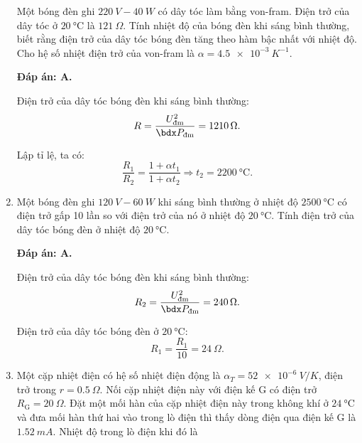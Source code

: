 \begin{enumerate}[label=\bfseries Câu \arabic*:]
	\cauhoi
	{Một bóng đèn ghi $\SI{220}{V} - \SI{40}{W}$ có dây tóc làm bằng von-fram. Điện trở của dây tóc ở $\SI{20}{\celsius}$ là $\SI{121}{\Omega}$. Tính nhiệt độ của bóng đèn khi sáng bình thường, biết rằng điện trở của dây tóc bóng đèn tăng theo hàm bậc nhất với nhiệt độ. Cho hệ số nhiệt điện trở của von-fram là $\alpha = \SI{4.5e-3}{K^{-1}}$.
		
	}
	\loigiai
	{	\textbf{Đáp án: A.}
		
		Điện trở của dây tóc bóng đèn khi sáng bình thường:
		$$R=\dfrac{U_\text{đm}^2}{\calP_\text{đm}} = \SI{1210}{\Omega}.$$
		
		Lập tỉ lệ, ta có:
		$$\dfrac{R_1}{R_2} = \dfrac{1+ \alpha t_1}{1 + \alpha t_2} \Rightarrow t_2 = \SI{2200}{\celsius}.$$
	}
	\item {}
	
	\cauhoi
	{Một bóng đèn ghi $\SI{120}{V} - \SI{60}{W}$ khi sáng bình thường ở nhiệt độ $\SI{2500}{\celsius}$ có điện trở gấp 10 lần so với điện trở của nó ở nhiệt độ $\SI{20}{\celsius}$. Tính điện trở của dây tóc bóng đèn ở nhiệt độ $\SI{20}{\celsius}$.
		
	}
	\loigiai
	{	\textbf{Đáp án: A.}
		
		Điện trở của dây tóc bóng đèn khi sáng bình thường:
		$$R_2 = \dfrac{U_\text{đm}^2}{\calP_\text{đm}} = \SI{240}{\Omega}.$$
		
		Điện trở của dây tóc bóng đèn ở $\SI{20}{\celsius}$:
		$$R_1 = \dfrac{R_1}{10}= \SI{24}{\Omega}.$$
	}
	\item {}

\cauhoi
{Một cặp nhiệt điện có hệ số nhiệt điện động là $\alpha_T = \SI{52e-6}{V / K}$, điện trở trong $r=\SI{0.5}{\Omega}$. Nối cặp nhiệt điện này với điện kế G có điện trở $R_\text{G} = \SI{20}{\Omega}$. Đặt một mối hàn của cặp nhiệt điện này trong không khí ở $\SI{24}{\celsius}$ và đưa mối hàn thứ hai vào trong lò điện thì thấy dòng điện qua điện kế G là $\SI{1.52}{mA}$. Nhiệt độ trong lò điện khi đó là
	\begin{mcq}(4)
		\item $\SI{304}{\celsius}$.
		\item $\SI{623}{\celsius}$.
		\item $\SI{3120}{\celsius}$.
		\item $\SI{3100}{\celsius}$.
	\end{mcq}
	
}
\end{enumerate}
